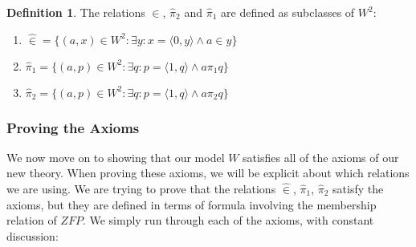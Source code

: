 \documentclass[11pt]{article}
\newcommand{\pleft}{\mathrel{\pi_1}}
\newcommand{\pright}{\mathrel{\pi_2}}
\newcommand{\pair}[2]{\langle #1,#2 \rangle}
\newcommand{\zin}{\mathrel{\widehat{\in}}}
\newcommand{\zpright}{\mathrel{\widehat{\pi}_2}}
\newcommand{\zpleft}{\mathrel{\widehat{\pi}_1}}
\theoremstyle{definition}
\theoremstyle{theorem}
\theoremstyle{lemma}
\newtheorem{definition}{Definition}[section]
\begin{document}
\begin{definition} The relations $\zin$, $\zpright$ and $\zpleft$ are defined as subclasses of $W^2$:
  \begin{enumerate}[label=(\roman*)]
    \item $\zin = \{(a,x)\in W^2: \exists y: x = \pair{0}{y} \wedge a \in y\}$
    \item $\zpleft = \{(a,p)\in W^2 : \exists q: p = \pair{1}{q} \wedge a\pleft q\}$
    \item $\zpright = \{(a,p)\in W^2 : \exists q: p = \pair{1}{q} \wedge a\pright q\}$
  \end{enumerate}
\end{definition}

\subsubsection{Proving the Axioms}
We now move on to showing that our model $W$ satisfies all of the axioms of our new theory. When proving these axioms, we will be explicit about which relations we are using. We are trying to prove that the relations $\zin$, $\zpleft$, $\zpright$ satisfy the axioms, but they are defined in terms of formula involving the membership relation of $\mathit{ZFP}$. We simply run through each of the axioms, with constant discussion:
\end{document}
